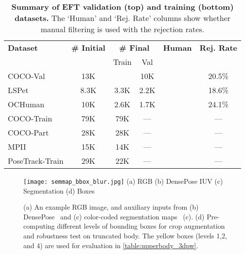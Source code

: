 \documentclass[10pt,twocolumn,letterpaper]{article}
\newcommand{\cmark}{\ding{51}}\newcommand{\xmark}{\ding{55}}
\begin{document}
	
	\begin{table}[t]
		\centering
		\footnotesize
		\begin{tabular}{l c c c c c}
			\toprule
			\textbf{Dataset} & \!\!\textbf{\# Initial}\! &  \multicolumn{2}{c}{\textbf{\# Final}} & \!\!\textbf{Human}\!\! &
			\textbf{Rej. Rate} \\
			&                                & Train & Val  &      & \\
			\midrule
			COCO-Val~\cite{lin2014microsoft} & 13K   &      & 10K  & \cmark & 20.5\% \\
			LSPet~\cite{Johnson11}           & 8.3K  & 3.3K & 2.2K & \cmark & 18.6\% \\
			OCHuman~\cite{pose2seg2019}      & 10K  & 2.6K & 1.7K & \cmark & 24.1\% \\
			\midrule
			COCO-Train                       &  79K     & 79K  & ---  & \xmark & --- \\
			COCO-Part                        &  28K     & 28K  & ---  & \xmark & --- \\
			MPII                             &  15K     & 14K  & ---  & \xmark & --- \\
			PoseTrack-Train                        &   29K   & 22K  & ---  & \xmark & --- \\
			\bottomrule
		\end{tabular}
		\caption{
			\textbf{Summary of EFT validation (top) and training (bottom) datasets.} The `Human' and `Rej. Rate' columns show whether manual filtering is used with the rejection rates.}\label{table:eft_dataset}
	\end{table}
	
	\begin{figure}
\texttt{[image: semmap\_bbox\_blur.jpg]}
		{\footnotesize \hspace*{0.1cm} (a) RGB \hspace*{0.4cm} (b) DensePose IUV \hspace*{0.1cm} (c) Segmentation \hspace*{0.3cm} (d) Boxes}\vspace*{2pt}
		\caption{(a) An example RGB image, and auxiliary inputs from (b) DensePose~\cite{guler2018densepose} and (c) color-coded segmentation maps~\cite{wu2019detectron2, kirillov2019panoptic} (c).  (d) Pre-computing different levels of bounding boxes for crop augmentation and robustness test on truncated body. The yellow boxes (levels 1,2, and 4) are used for evaluation in \cref{table:upperbody_3dpw}.}\label{fig:eft_bbox}
		
\end{figure}
	
\end{document}

